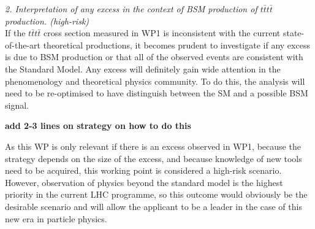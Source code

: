 \noindent\textit{2. Interpretation of any excess in the context of BSM production of $t\bar{t}t\bar{t}$ production. (high-risk)}\\

If the $t\bar{t}t\bar{t}$ cross section measured in WP1 is inconsistent with the current state-of-the-art theoretical productions, it becomes prudent to investigate if any excess is due to BSM production or that all of the observed events are consistent with the Standard Model. Any excess will definitely gain wide attention in the phenomenology and theoretical physics community. To do this, the analysis will need to be re-optimised to have distinguish between the SM and a possible BSM signal. 

{\bf add 2-3 lines on strategy on how to do this}

As this WP is only relevant if there is an excess observed in WP1, because the strategy depends on the size of the excess, and because knowledge of new tools need to be acquired, this working point is considered a high-risk scenario.  However, observation of physics beyond the standard model is the highest priority in the current LHC programme, so this outcome would obviously be the desirable scenario and will allow the applicant to be a leader in the case of this new era in particle physics.

